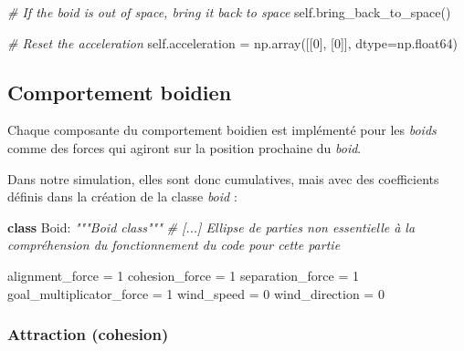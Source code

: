 \documentclass[
]{article}
\newenvironment{Shaded}{}{}
\newcommand{\CommentTok}[1]{\textcolor[rgb]{0.38,0.63,0.69}{\textit{#1}}}
\newcommand{\DecValTok}[1]{\textcolor[rgb]{0.25,0.63,0.44}{#1}}
\newcommand{\KeywordTok}[1]{\textcolor[rgb]{0.00,0.44,0.13}{\textbf{#1}}}
\newcommand{\NormalTok}[1]{#1}
\newcommand{\OperatorTok}[1]{\textcolor[rgb]{0.40,0.40,0.40}{#1}}
\newcommand{\VariableTok}[1]{\textcolor[rgb]{0.10,0.09,0.49}{#1}}
\begin{document}
\begin{Shaded}
\begin{Highlighting}[]
    \CommentTok{\# If the boid is out of space, bring it back to space}
    \VariableTok{self}\NormalTok{.bring\_back\_to\_space()}

    \CommentTok{\# Reset the acceleration}
    \VariableTok{self}\NormalTok{.acceleration }\OperatorTok{=}\NormalTok{ np.array([[}\DecValTok{0}\NormalTok{], [}\DecValTok{0}\NormalTok{]], dtype}\OperatorTok{=}\NormalTok{np.float64)}
\end{Highlighting}
\end{Shaded}

\hypertarget{comportement-boidien}{%
\subsection{Comportement boidien}\label{comportement-boidien}}

Chaque composante du comportement boidien est implémenté pour les
\emph{boids} comme des forces qui agiront sur la position prochaine du
\emph{boid}.

Dans notre simulation, elles sont donc cumulatives, mais avec des
coefficients définis dans la création de la classe \emph{boid} :

\begin{Shaded}
\begin{Highlighting}[]
\KeywordTok{class}\NormalTok{ Boid:}
    \CommentTok{"""Boid class"""}
    \CommentTok{\# [...] Ellipse de parties non essentielle à la compréhension du fonctionnement du code pour cette partie}

\NormalTok{    alignment\_force }\OperatorTok{=} \DecValTok{1}
\NormalTok{    cohesion\_force }\OperatorTok{=} \DecValTok{1}
\NormalTok{    separation\_force }\OperatorTok{=} \DecValTok{1}
\NormalTok{    goal\_multiplicator\_force }\OperatorTok{=} \DecValTok{1}
\NormalTok{    wind\_speed }\OperatorTok{=} \DecValTok{0}
\NormalTok{    wind\_direction }\OperatorTok{=} \DecValTok{0}
\end{Highlighting}
\end{Shaded}

\hypertarget{attraction-cohesion}{%
\subsubsection{Attraction (cohesion)}\label{attraction-cohesion}}
\end{document}
